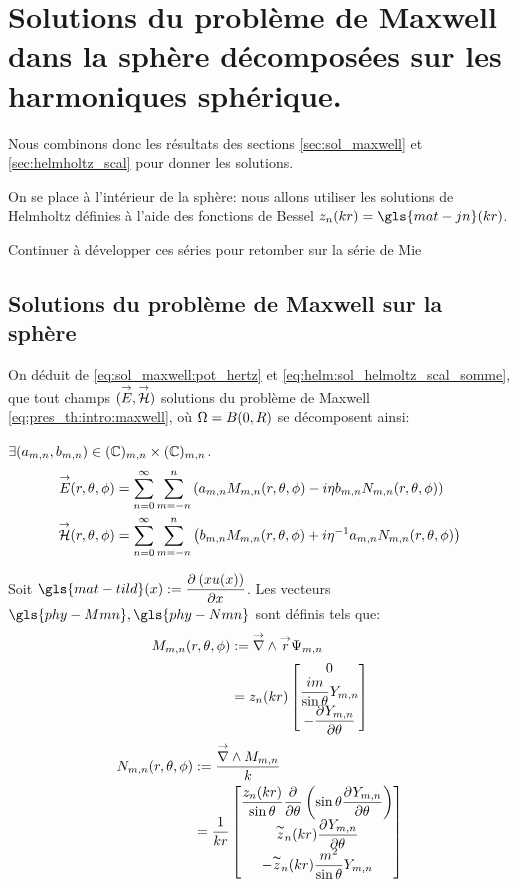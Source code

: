 \section{Solutions du problème de Maxwell dans la sphère décomposées sur les harmoniques sphérique.}\label{sec:maxwell_harmonique}

Nous combinons donc les résultats des sections \ref{sec:sol_maxwell} et \ref{sec:helmholtz_scal} pour donner les solutions.

On se place à l'intérieur de la sphère: nous allons utiliser les solutions de Helmholtz définies à l'aide des fonctions de Bessel \(z_n(kr) = \gls{mat-jn}(kr)\).


\begin{TODO}
  Continuer à développer ces séries pour retomber sur la série de Mie
\end{TODO}

\subsection{Solutions du problème de Maxwell sur la sphère}
On déduit de  \eqref{eq:sol_maxwell:pot_hertz} et \eqref{eq:helm:sol_helmoltz_scal_somme}, que tout champs \(({\overset{\rightarrow}{E}},{\overset{\rightarrow}{\mathcal{H}}})\) solutions du problème de Maxwell \eqref{eq:pres_th:intro:maxwell}, où \(\Omega = B(0,R)\) se décomposent ainsi:

\(\exists (a_{m,n},b_{m,n}) \in (\mathbb C)_{m,n}\times (\mathbb C)_{m,n}\).
\begin{align*}
  {\overset{\rightarrow}{E}}(r,\theta,\phi) &= \sum\limits_{n=0}^\infty\sum\limits_{m=-n}^n\left( a_{m,n}   M_{m,n}(r,\theta,\phi) - i \eta b_{m,n} N_{m,n}(r,\theta,\phi)\right)\\
  {\overset{\rightarrow}{\mathcal{H}}}(r,\theta,\phi) &= \sum\limits_{n=0}^\infty\sum\limits_{m=-n}^n\left( b_{m,n}   M_{m,n}(r,\theta,\phi) + i {\eta}^{-1} a_{m,n} N_{m,n}(r,\theta,\phi)\right)
\end{align*}

Soit \(\gls{mat-tild}(x) := \ddr{x}{\left(xu(x)\right)}\). Les vecteurs \(\gls{phy-Mmn} ,\gls{phy-Nmn}\) sont définis tels que:
\begin{align}
  M_{m,n}(r,\theta,\phi) &:= {\overset{\rightarrow}{\nabla}}\wedge {\overset{\rightarrow}{r}} \Psi_{m,n} \\
  &= z_n(kr)
  \begin{bmatrix}
    0 \\ \dfrac{im}{\sin\theta}Y_{m,n}\\
    - \dfrac{\partial^{{}} Y_{m,n}}{{\partial \theta}^{{}}}
  \end{bmatrix}
\end{align}
\begin{align}
  N_{m,n}(r,\theta,\phi) &:= \dfrac{{\overset{\rightarrow}{\nabla}}\wedge M_{m,n}}{k} \\
  &= \dfrac{1}{kr}\begin{bmatrix}
    \dfrac{z_n(kr)}{\sin\theta}\dfrac{\partial^{{}} }{{\partial \theta}^{{}}}\left(\sin\theta\dfrac{\partial^{{}} Y_{m,n}}{{\partial \theta}^{{}}}\right)\\
    \overset{\thicksim}{z}_n(kr)\dfrac{\partial^{{}} Y_{m,n}}{{\partial \theta}^{{}}}\\
    -\overset{\thicksim}{z}_n(kr)\dfrac{m^2}{\sin\theta}Y_{m,n}\\
  \end{bmatrix}
\end{align}


